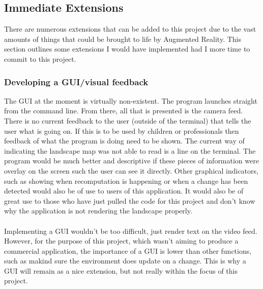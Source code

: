 \documentclass[11pt]{article}
\begin{document}
\subsection{Immediate Extensions}
There are numerous extensions that can be added to this project due to the 
vast amounts of things that could be brought to life by Augmented Reality.
This section outlines some extensions I would have implemented had I
more time to commit to this project.

\subsubsection{Developing a GUI/visual feedback}
The GUI at the moment is virtually non-existent. The program launches 
straight from the command line. From there, all that is presented is
the camera feed. There is no current feedback to the user (outside of
the terminal) that tells the user what is going on. If this is to be
used by children or professionals then feedback of what the program is doing
need to be shown. The current way of indicating the landscape map was
not able to read is a line on the terminal. The program would be
much better and descriptive if these pieces of information were overlay
on the screen such the user can see it directly. Other graphical indicators,
such as showing when recomputation is happening or when a change has been
detected would also be of use to users of this application. It would 
also be of great use to those who have just pulled the code for this
project and don't know why the application is not rendering the 
landscape properly.\\
\\
Implementing a GUI wouldn't be too difficult, just render text on the 
video feed. However, for the purpose of this project, which wasn't aiming
to produce a commercial application, the importance of a GUI is
lower than other functions, such as makind sure the environment does update
on a change. This is why a GUI will remain as a nice extension, but not
really within the focus of this project.
\end{document}
